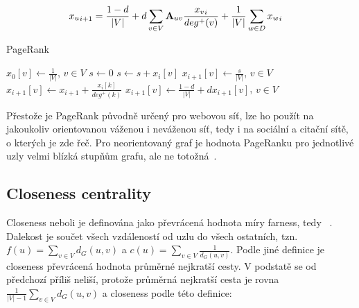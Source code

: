 \documentclass{bakalarka}
\begin{document}
\begin{align*}
{x_u}_{i + 1} &= \frac{1 - d}{|V|} + d \displaystyle\sum_{v \in V} {\bf A}_{uv} \frac{{x_v}_i}{deg^+ (v)} + \frac{1}{|V|} \displaystyle\sum_{w \in D} {x_w}_i
\end{align*}


\begin{center}
\begin{minipage}{\textwidth}
\begin{algorithm}[H]
	\caption{PageRank}
		\label{alg:pagerank}

	\begin{algorithmic}[1]
	\Statex
	\State $x_0[v] \gets \frac{1}{|V|}$, $v \in V$
		\State $s \gets 0$
				\State $s \gets s + x_{i}[v]$
			\EndIf
		\EndFor
		\State $x_{i + 1}[v] \gets \frac{s}{|V|}$, $v \in V$
				\State $x_{i + 1}[v] \gets x_{i + 1} + \frac{x_i[k]}{deg^+(k)}$
			\EndFor
		\EndFor
		\State $x_{i + 1}[v] \gets \frac{1 - d}{|V|} + d x_{i + 1}[v]$, $v \in V$
	\EndFor
	\end{algorithmic}
\end{algorithm}
\end{minipage}
\end{center}
\mbox{}

Přestože je PageRank původně určený pro webovou síť, lze ho použít na
jakoukoliv orientovanou váženou i neváženou síť, tedy i na sociální a citační
sítě, o kterých je zde řeč. Pro neorientovaný graf je hodnota PageRanku pro
jednotlivé uzly velmi blízká stupňům grafu, ale ne
totožná~\citep{perrafortunato2008}.


\subsection{Closeness centrality}
Closeness neboli  je definována jako převrácená hodnota míry
farness, tedy ~\citep{sabidussi1966}. Dalekost je součet všech
vzdáleností od uzlu do všech ostatních, tzn. $f(u) = \sum_{v \in V} d_G(u, v)$
a $c(u) = \sum_{v \in V} \frac{1}{d_G(u, v)}$. Podle jiné definice je closeness
převrácená hodnota průměrné nejkratší cesty. V podstatě se od předchozí příliš
neliší, protože průměrná nejkratší cesta je rovna $\frac{1}{|V|
- 1} \sum_{v \in V} d_G(u, v)$ a closeness podle této definice:
\end{document}
